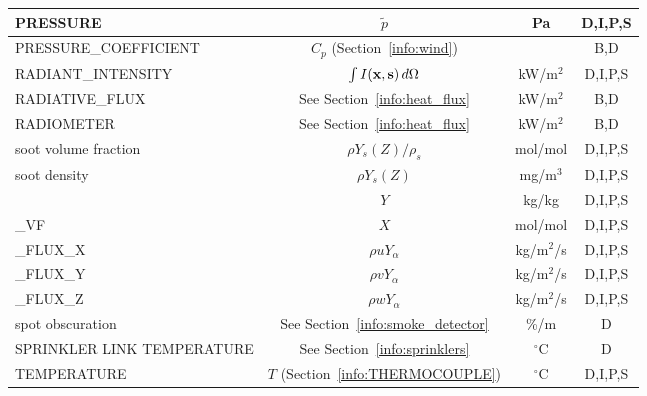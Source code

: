 \documentclass[11pt]{book}
\newcommand{\bx}{{\bf x}}
\newcommand{\bs}{{\bf s}}
\newcommand{\tp}{\tilde{p}}
\begin{document}
\begin{table}[h!]
\begin{center}
\begin{tabular}{|l|c|c|c|}
{\ct PRESSURE}                                  & $\tp$                                         & Pa             & D,I,P,S      \\ \hline
{\ct PRESSURE\_COEFFICIENT}                     & $C_p$ (Section~\ref{info:wind})               &                & B,D          \\ \hline
{\ct RADIANT\_INTENSITY}                        & $\int I(\bx,\bs)\, d\Omega$                   & kW/m$^2$       & D,I,P,S      \\ \hline
{\ct RADIATIVE\_FLUX}                           & See Section~\ref{info:heat_flux}              & kW/m$^2$       & B,D          \\ \hline
{\ct RADIOMETER}                                & See Section~\ref{info:heat_flux}              & kW/m$^2$       & B,D          \\ \hline
{\ct soot volume fraction}                      & $\rho Y_s(Z)/\rho_s$                          & mol/mol        & D,I,P,S      \\ \hline
{\ct soot density}                              & $\rho Y_s(Z)$                                 & mg/m$^3$       & D,I,P,S      \\ \hline
{\ct [SPEC\_ID]}                                & $Y$                                           & kg/kg          & D,I,P,S      \\ \hline
{\ct [SPEC\_ID]\_VF}                            & $X$                                           & mol/mol        & D,I,P,S      \\ \hline
{\ct [SPEC\_ID]\_FLUX\_X}                       & $\rho u Y_\alpha$                             & kg/m$^2$/s     & D,I,P,S      \\ \hline
{\ct [SPEC\_ID]\_FLUX\_Y}                       & $\rho v Y_\alpha$                             & kg/m$^2$/s     & D,I,P,S      \\ \hline
{\ct [SPEC\_ID]\_FLUX\_Z}                       & $\rho w Y_\alpha$                             & kg/m$^2$/s     & D,I,P,S      \\ \hline
{\ct spot obscuration}                          & See Section~\ref{info:smoke_detector}         & \%/m           & D            \\ \hline
{\ct SPRINKLER LINK TEMPERATURE}                & See Section~\ref{info:sprinklers}             & $^\circ$C      & D            \\ \hline
{\ct TEMPERATURE}                               & $T$ (Section~\ref{info:THERMOCOUPLE})         & $^\circ$C      & D,I,P,S      \\ \hline

\end{tabular}
\end{center}
\end{table}
\end{document}
